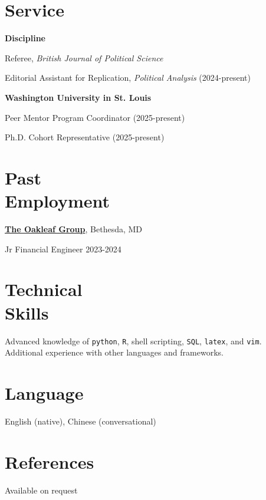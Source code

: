 \documentclass[margin,line,pifont,palatino,courier]{res}
\newenvironment{list1}{
  \begin{list}{\ding{113}}{%
      \setlength{\itemsep}{0in}
      \setlength{\parsep}{0in} \setlength{\parskip}{0in}
      \setlength{\topsep}{0in} \setlength{\partopsep}{0in}
      \setlength{\leftmargin}{0.17in}}}{\end{list}}
\begin{document}
\begin{resume}
\section{\sc Service}

\textbf{Discipline}
\begin{list1}
\item [] Referee, \textit{British Journal of Political Science}
\item [] Editorial Assistant for Replication, \textit{Political Analysis} (2024-present)
\end{list1}
\textbf{Washington University in St. Louis}
\begin{list1}
\item [] Peer Mentor Program Coordinator (2025-present)
\item [] Ph.D. Cohort Representative (2025-present)
\end{list1}
\section{\sc Past \\ Employment}

\href{https://oakleaf.com/}{\textbf{The Oakleaf Group}}, Bethesda, MD
\begin{list1}
\item[] Jr Financial Engineer \hfill{2023-2024}
\end{list1}


\section{\sc Technical \\ Skills}

Advanced knowledge of \texttt{python}, \texttt{R}, shell scripting, \texttt{SQL}, \texttt{latex}, and \texttt{vim}. Additional experience with other languages and frameworks. %

\section{\sc Language}

English (native), Chinese (conversational)

\section{\sc References} Available on request

\end{resume}
\end{document}
